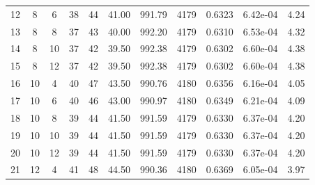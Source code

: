 {\begin{longtable}{|c|c|c|c|c|c|c|c|c|c|c|}
            12           & 8              & 6              & 38                  & 44                   & 41.00                & 991.79            & 4179               & 0.6323               & 6.42e-04         & 4.24            \\
            13           & 8              & 8              & 37                  & 43                   & 40.00                & 992.20            & 4179               & 0.6310               & 6.53e-04         & 4.32            \\
            14           & 8              & 10             & 37                  & 42                   & 39.50                & 992.38            & 4179               & 0.6302               & 6.60e-04         & 4.38            \\
            15           & 8              & 12             & 37                  & 42                   & 39.50                & 992.38            & 4179               & 0.6302               & 6.60e-04         & 4.38            \\ \hline
            16           & 10             & 4              & 40                  & 47                   & 43.50                & 990.76            & 4180               & 0.6356               & 6.16e-04         & 4.05            \\
            17           & 10             & 6              & 40                  & 46                   & 43.00                & 990.97            & 4180               & 0.6349               & 6.21e-04         & 4.09            \\
            18           & 10             & 8              & 39                  & 44                   & 41.50                & 991.59            & 4179               & 0.6330               & 6.37e-04         & 4.20            \\
            19           & 10             & 10             & 39                  & 44                   & 41.50                & 991.59            & 4179               & 0.6330               & 6.37e-04         & 4.20            \\
            20           & 10             & 12             & 39                  & 44                   & 41.50                & 991.59            & 4179               & 0.6330               & 6.37e-04         & 4.20            \\ \hline
            21           & 12             & 4              & 41                  & 48                   & 44.50                & 990.36            & 4180               & 0.6369               & 6.05e-04         & 3.97            \\

\end{longtable}}
